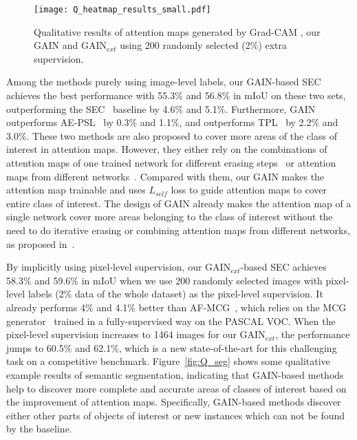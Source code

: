 \documentclass[10pt,twocolumn,letterpaper]{article}
\begin{document}
\begin{figure*}%
\centering
\texttt{[image: Q\_heatmap\_results\_small.pdf]} %
\caption{Qualitative results of attention maps generated by Grad-CAM \cite{grad-cam}, our GAIN and GAIN$_{ext}$ using 200 randomly selected (2\%) extra supervision.}
\label{fig:Q_heatmaps}
\end{figure*}
Among the methods purely using image-level labels, our GAIN-based SEC achieves the best performance with 55.3\% and 56.8\% in mIoU on these two sets, outperforming the SEC~\cite{kolesnikov2016seed} baseline by 4.6\% and 5.1\%. Furthermore, GAIN outperforms AE-PSL~\cite{wei2017object} by 0.3\% and 1.1\%, and outperforms TPL~\cite{kim2017two} by 2.2\% and 3.0\%. These two methods are also proposed to cover more areas of the class of interest in attention maps. However, they either rely on the combinations of attention maps of one trained network for different erasing steps~\cite{wei2017object} or attention maps from different networks~\cite{kim2017two}. Compared with them, our GAIN makes the attention map trainable and uses $L_{self}$ loss to guide attention maps to cover entire class of interest. The design of GAIN already makes the attention map of a single network cover more areas belonging to the class of interest without the need to do iterative erasing or combining attention maps from different networks, as proposed in~\cite{kim2017two,wei2017object}.




By implicitly using pixel-level supervision, our GAIN$_{ext}$-based SEC achieves 58.3\% and 59.6\% in mIoU when we use 200 randomly selected images with pixel-level labels (2\% data of the whole dataset) as the pixel-level supervision. It already performs 4\% and 4.1\% better than AF-MCG~\cite{zhou2016learning}, which relies on the MCG generator~\cite{arbelaez2014multiscale} trained in a fully-supervised way on the PASCAL VOC. When the pixel-level supervision increases to 1464 images for our GAIN$_{ext}$, the performance jumps to 60.5\% and 62.1\%, which is a new state-of-the-art for this challenging task on a competitive benchmark. Figure~\ref{fig:Q_seg} shows some qualitative example results of semantic segmentation, indicating that GAIN-based methods help to discover more complete and accurate areas of classes of interest based on the improvement of attention maps. Specifically, GAIN-based methods discover either other parts of objects of interest or new instances which can not be found by the baseline.
\end{document}
